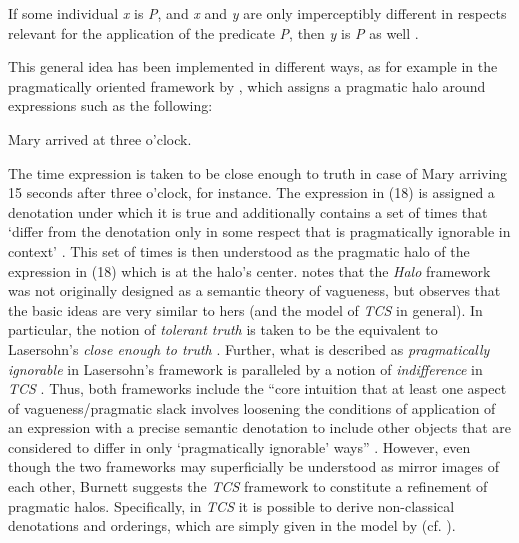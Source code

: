 \documentclass[output=paper
,modfonts
,nonflat]{langsci/langscibook}
\begin{document}
\begin{examples}
	\item If some individual \textit{x} is \textit{P}, and \textit{x} and \textit{y} are only imperceptibly different in respects relevant for the application of the predicate \textit{P}, then \textit{y} is \textit{P} as well \textcite[348]{Cobreros2012}.
\end{examples}

This general idea has been implemented in different ways, as for example in the pragmatically oriented framework by \citet{Lasersohn1999}, which assigns a pragmatic halo around expressions such as the following:

\begin{examples}
	\item Mary arrived at three o'clock.
\end{examples}

The time expression is taken to be close enough to truth in case of Mary arriving 15 seconds after three o'clock, for instance. The expression in (18) is assigned a denotation under which it is true and additionally contains a set of times that `differ from the denotation only in some respect that is pragmatically ignorable in context' \textcite[526]{Lasersohn1999}. This set of times is then understood as the pragmatic halo of the expression in (18) which is at the halo's center. \textcite[29]{Burnett2017} notes that the \textit{Halo} framework was not originally designed as a semantic theory of vagueness, but observes that the basic ideas are very similar to hers (and the model of \textit{TCS} in general). In particular, the notion of \textit{tolerant truth} is taken to be the equivalent to Lasersohn's \textit{close enough to truth} \textcite[32]{Burnett2017}. Further, what is described as \textit{pragmatically ignorable} in Lasersohn's framework is paralleled by a notion of \textit{indifference} in \textit{TCS} \textcite[32]{Burnett2017}. Thus, both frameworks include the ``core intuition that at least one aspect of vagueness/pragmatic slack involves loosening the conditions of application of an expression with a precise semantic denotation to include other objects that are considered to differ in only `pragmatically ignorable' ways'' \textcite[32--33]{Burnett2017}. However, even though the two frameworks may superficially be understood as mirror images of each other, Burnett suggests the \textit{TCS} framework to constitute a refinement of pragmatic halos. Specifically, in \textit{TCS} it is possible to derive non-classical denotations and orderings, which are simply given in the model by \citet{Lasersohn1999} (cf. \textcite[33]{Burnett2017}).
\end{document}
